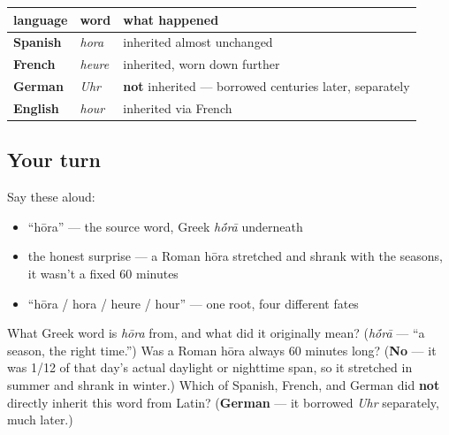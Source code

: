 \begin{cousinweb}
\noindent
\begin{tabularx}{\linewidth}{@{}>{\raggedright\arraybackslash}X>{\raggedright\arraybackslash}X>{\raggedright\arraybackslash}X@{}}
\toprule
\textbf{language} & \textbf{word} & \textbf{what happened} \\
\midrule
\textbf{Spanish} & \emph{hora} & inherited almost unchanged \\
\textbf{French} & \emph{heure} & inherited, worn down further \\
\textbf{German} & \emph{Uhr} & \textbf{not} inherited — borrowed centuries later, separately \\
\textbf{English} & \emph{hour} & inherited via French \\
\bottomrule
\end{tabularx}
\end{cousinweb}

\subsection*{Your turn}
Say these aloud:

\begin{itemize}
\raggedright
  \item \textquotedblleft{}hōra\textquotedblright{} — the source word, Greek \emph{h\'{\={o}}rā} underneath
  \item the honest surprise — a Roman hōra stretched and shrank with the seasons, it wasn't a fixed 60 minutes
  \item \textquotedblleft{}hōra / hora / heure / hour\textquotedblright{} — one root, four different fates
\end{itemize}

\begin{tcolorbox}[breakable,colback=teal!4,colframe=teal!35!black,title={Before you move on}]
What Greek word is \emph{hōra} from, and what did it originally mean? (\emph{h\'{\={o}}rā} — \textquotedblleft{}a season, the right time.\textquotedblright{}) Was a Roman hōra always 60 minutes long? (\textbf{No} — it was 1/12 of that day's actual daylight or nighttime span, so it stretched in summer and shrank in winter.) Which of Spanish, French, and German did \textbf{not} directly inherit this word from Latin? (\textbf{German} — it borrowed \emph{Uhr} separately, much later.)
\end{tcolorbox}
